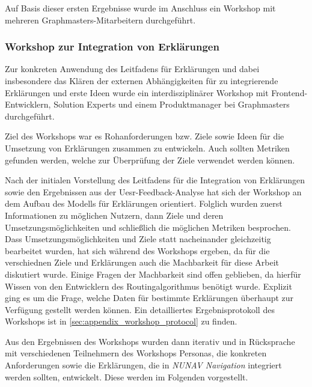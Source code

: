 \bigskip

Auf Basis dieser ersten Ergebnisse wurde im Anschluss ein Workshop mit mehreren Graphmasters-Mitarbeitern durchgeführt.

\subsubsection{Workshop zur Integration von Erklärungen}


Zur konkreten Anwendung des Leitfadens für Erklärungen und dabei insbesondere das Klären der externen Abhängigkeiten für zu integrierende Erklärungen und erste Ideen wurde ein interdisziplinärer Workshop mit Frontend-Entwicklern, \glqq Solution Experts\grqq{} und einem Produktmanager bei Graphmasters durchgeführt.

Ziel des Workshops war es Rohanforderungen bzw. Ziele sowie Ideen für die Umsetzung von Erklärungen zusammen zu entwickeln. Auch sollten Metriken gefunden werden, welche zur Überprüfung der Ziele verwendet werden können.

Nach der initialen Vorstellung des Leitfadens für die Integration von Erklärungen sowie den Ergebnissen aus der Uesr-Feedback-Analyse hat sich der Workshop an dem Aufbau des Modells für Erklärungen orientiert. Folglich wurden zuerst Informationen zu möglichen Nutzern, dann Ziele und deren Umsetzungsmöglichkeiten und schließlich die möglichen Metriken besprochen. Dass Umsetzungsmöglichkeiten und Ziele statt nacheinander gleichzeitig bearbeitet wurden, hat sich während des Workshops ergeben, da für die verschiednen Ziele und Erklärungen auch die Machbarkeit für diese Arbeit diskutiert wurde. Einige Fragen der Machbarkeit sind offen geblieben, da hierfür Wissen von den Entwicklern des Routingalgorithmus benötigt wurde. Explizit ging es um die Frage, welche Daten für bestimmte Erklärungen überhaupt zur Verfügung gestellt werden können. Ein detailliertes Ergebnisprotokoll des Workshops ist in \autoref{sec:appendix_workshop_protocol} zu finden.

Aus den Ergebnissen des Workshops wurden dann iterativ und in Rücksprache mit verschiedenen Teilnehmern des Workshops Personas, die konkreten Anforderungen sowie die Erklärungen, die in \textit{NUNAV Navigation} integriert werden sollten, entwickelt. Diese werden im Folgenden vorgestellt.